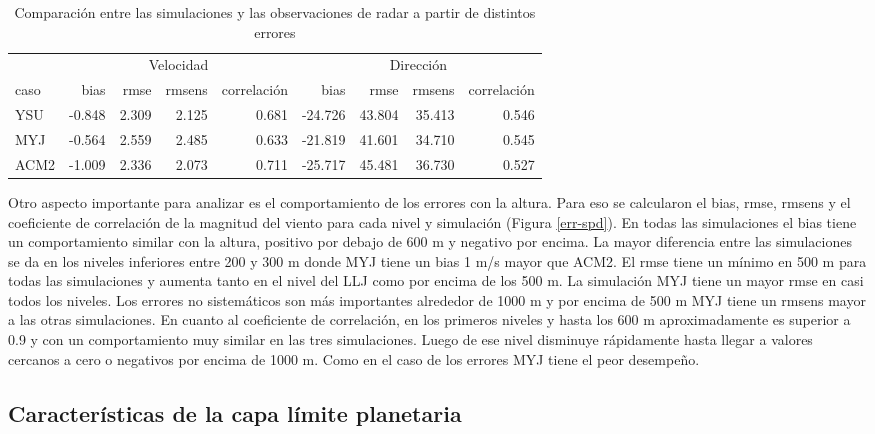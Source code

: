 \documentclass[12pt,spanish,oneside, a4paper]{book}
\begin{document}
\begin{table}[!h]

\caption{\label{tab:err-tabla}Comparación entre las simulaciones y las observaciones de radar a partir de distintos errores \label{err}}
\centering
\begin{tabular}[t]{lrrrrrrrr}
\toprule
\multicolumn{1}{c}{ } & \multicolumn{4}{c}{Velocidad} & \multicolumn{4}{c}{Dirección} \\
\cmidrule(l{2pt}r{2pt}){2-5} \cmidrule(l{2pt}r{2pt}){6-9}
caso & bias & rmse & rmsens & correlación & bias & rmse & rmsens & correlación\\
\midrule
YSU & -0.848 & 2.309 & 2.125 & 0.681 & -24.726 & 43.804 & 35.413 & 0.546\\
MYJ & -0.564 & 2.559 & 2.485 & 0.633 & -21.819 & 41.601 & 34.710 & 0.545\\
ACM2 & -1.009 & 2.336 & 2.073 & 0.711 & -25.717 & 45.481 & 36.730 & 0.527\\
\bottomrule
\end{tabular}
\end{table}

Otro aspecto importante para analizar es el comportamiento de los
errores con la altura. Para eso se calcularon el bias, rmse, rmsens y el
coeficiente de correlación de la magnitud del viento para cada nivel y
simulación (Figura \ref{err-spd}). En todas las simulaciones el bias
tiene un comportamiento similar con la altura, positivo por debajo de
600 m y negativo por encima. La mayor diferencia entre las simulaciones
se da en los niveles inferiores entre 200 y 300 m donde MYJ tiene un
bias 1 m/s mayor que ACM2. El rmse tiene un mínimo en 500 m para todas
las simulaciones y aumenta tanto en el nivel del LLJ como por encima de
los 500 m. La simulación MYJ tiene un mayor rmse en casi todos los
niveles. Los errores no sistemáticos son más importantes alrededor de
1000 m y por encima de 500 m MYJ tiene un rmsens mayor a las otras
simulaciones. En cuanto al coeficiente de correlación, en los primeros
niveles y hasta los 600 m aproximadamente es superior a 0.9 y con un
comportamiento muy similar en las tres simulaciones. Luego de ese nivel
disminuye rápidamente hasta llegar a valores cercanos a cero o negativos
por encima de 1000 m. Como en el caso de los errores MYJ tiene el peor
desempeño.

\subsection{Características de la capa límite
planetaria}\label{caracteristicas-de-la-capa-limite-planetaria-1}
\end{document}
